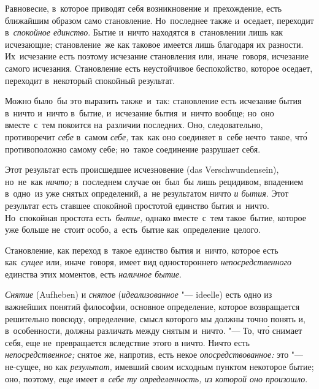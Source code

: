 Равновесие, в~которое приводят себя возникновение и~прехождение, есть ближайшим
образом само становление. Но~последнее также и~оседает, переходит
в~{\em спокойное единство}. Бытие и~ничто находятся в~становлении лишь как
исчезающие; становление~же как таковое имеется лишь благодаря их разности.
Их~исчезание есть поэтому исчезание становления или, иначе~говоря, исчезание
самого исчезания. Становление есть неустойчивое беспокойство, которое оседает,
переходит в~некоторый спокойный результат.

Можно было~бы это выразить также~и~так: становление есть исчезание бытия
в~ничто и~ничто в~бытие, и~исчезание бытия~и~ничто вообще; но~оно вместе~с~тем
покоится на~различии последних. Оно, следовательно, противоречит {\em себе}
в~самом {\em себе,} так~как оно соединяет в~себе нечто~такое, чт\'{о}
противоположно самому себе; но~такое соединение разрушает себя.

Этот результат есть происшедшее исчезновение (das Ver\-schwun\-den\-sein),
но~не~как {\em ничто;} в~последнем случае он~был~бы лишь рецидивом, впадением
в~одно~из уже снятых определений, а~не результатом ничто {\em и бытия}. Этот
результат есть ставшее спокойной простотой единство бытия и~ничто. Но~спокойная
простота есть~{\em бытие,} однако вместе~с~тем такое~бытие, которое уже больше
не~стоит особо, а~есть~бытие как~определение~целого.

Становление, как переход в~такое единство бытия и~ничто, которое есть
как~{\em сущее} или, иначе~говоря, имеет вид одностороннего
{\em непосредственного} единства этих моментов, есть {\em наличное бытие}.


{\em Снятие} (Aufheben) и {\em снятое} ({\em идеализованное} "--- ideelle) есть
одно из важнейших понятий философии, основное определение, которое возвращается
решительно повсюду, определение, смысл которого мы должны точно понять и,
в~особенности, должны различать между снятым и~ничто. "--- То, чт\'{о} снимает
себя, еще не~превращается вследствие этого в ничто. Ничто есть {\em
непосредственное;} снятое же, напротив, есть некое {\em опосредствованное:} это
"--- не-сущее, но как {\em результат,} имевший своим исходным пунктом некоторое
бытие; оно, поэтому, {\em еще} имеет {\em в~себе ту определенность, из которой
оно произошло}.

